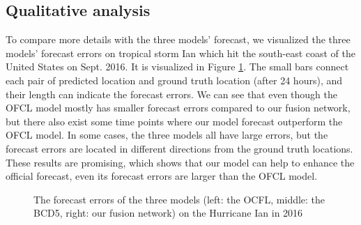 \subsection{Qualitative analysis}
To compare more details with the three models' forecast, we visualized the three models' forecast errors on tropical storm Ian which hit the south-east coast of the United States on Sept. 2016. It is visualized in Figure \ref{fig:compare_quantitative}. The small bars connect each pair of predicted location and ground truth location (after 24 hours), and their length can indicate the forecast errors. We can see that even though the OFCL model mostly has smaller forecast errors compared to our fusion network, but there also exist some time points where our model forecast outperform the OFCL model. In some cases, the three models all have large errors, but the forecast errors are located in different directions from the ground truth locations. These results are promising, which shows that our model can help to enhance the official forecast, even its forecast errors are larger than the OFCL model.  
\begin{figure}
	\begin{center}
		\hsize 
	\end{center}
	\caption{The forecast errors of the three models (left: the OCFL, middle: the BCD5, right: our fusion network) on the Hurricane Ian in 2016}
	\label{fig:compare_quantitative}
\end{figure}

